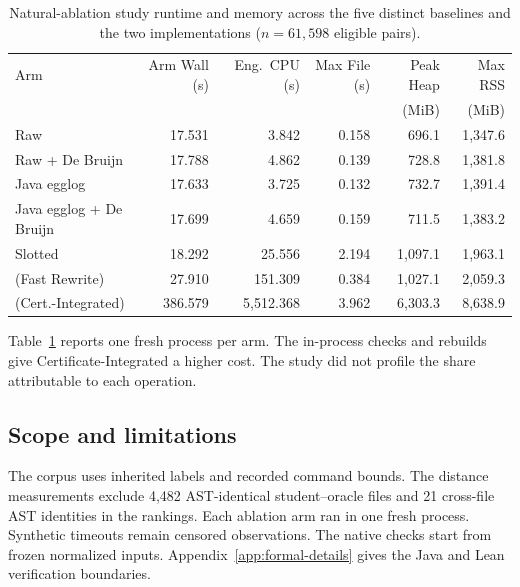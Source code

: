 \begin{table}[t]
\centering
\caption{Natural-ablation study runtime and memory across the five distinct
baselines and the two \CanDis{} implementations ($n=61{,}598$ eligible pairs).}
\label{tab:eval-runtime}
\scriptsize
\setlength{\tabcolsep}{2.1pt}
\begin{tabular}{@{}lrrrrr@{}}
\toprule
Arm & Arm Wall (s) & Eng.\ CPU (s) & Max File (s) & Peak Heap & Max RSS\\
& & & & (MiB) & (MiB)\\
\midrule
Raw & 17.531 & 3.842 & 0.158 & 696.1 & 1,347.6\\
Raw + De Bruijn & 17.788 & 4.862 & 0.139 & 728.8 & 1,381.8\\
Java egglog & 17.633 & 3.725 & 0.132 & 732.7 & 1,391.4\\
Java egglog + De Bruijn & 17.699 & 4.659 & 0.159 & 711.5 & 1,383.2\\
Slotted & 18.292 & 25.556 & 2.194 & 1,097.1 & 1,963.1\\
\CanDis{} (Fast Rewrite) & 27.910 & 151.309 & 0.384 & 1,027.1 & 2,059.3\\
\CanDis{} (Cert.-Integrated) & 386.579 & 5,512.368 & 3.962 & 6,303.3 & 8,638.9\\

\bottomrule
\end{tabular}
\end{table}

Table~\ref{tab:eval-runtime} reports one fresh process per arm.
The in-process checks and rebuilds give Certificate-Integrated a higher cost.
The study did not profile the share attributable to each operation.

\subsection{Scope and limitations}
\label{sec:eval-limits}

The corpus uses inherited labels and recorded command bounds. The distance
measurements exclude 4,482 AST-identical student--oracle files and 21 cross-file
AST identities in the rankings. Each ablation arm ran in one fresh process.
Synthetic timeouts remain censored observations. The native checks start from
frozen normalized inputs. Appendix~\ref{app:formal-details} gives the
Java and Lean verification boundaries.
